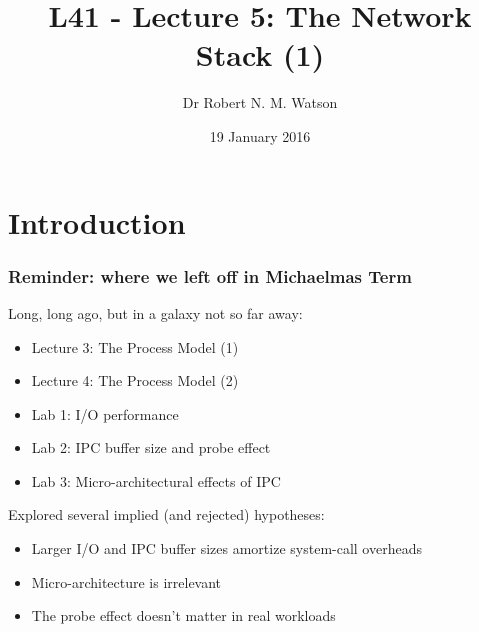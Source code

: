 
{
}

\usepackage[english]{babel}
\usepackage[latin1]{inputenc}
\usepackage{graphicx}
\usepackage{times}
\usepackage[T1]{fontenc}
\usepackage{fancyvrb}
\usepackage{listings}


\def\Tiny{\fontsize{4pt}{4pt} \selectfont}

\title{L41 - Lecture 5: The Network Stack (1)}
\author{Dr Robert N. M. Watson}
\date{19 January 2016}

\begin{frame}
  \titlepage
\end{frame}

\section{Introduction}

\begin{frame}
  \frametitle{Reminder: where we left off in Michaelmas Term}

  \pause

  Long, long ago, but in a galaxy not so far away:

  \begin{itemize}
    \item Lecture 3: The Process Model (1)
    \item Lecture 4: The Process Model (2)

    \pause
    \medskip

    \item Lab 1: I/O performance

    \pause
    \medskip

    \item Lab 2: IPC buffer size and probe effect
    \item Lab 3: Micro-architectural effects of IPC
  \end{itemize}

  \pause
  \medskip

  Explored several implied (and rejected) hypotheses:

  \begin{itemize}
    \item Larger I/O and IPC buffer sizes amortize system-call overheads

    \pause

    \item Micro-architecture is irrelevant

    \pause

    \item The probe effect doesn't matter in real workloads
  \end{itemize}
\end{frame}

